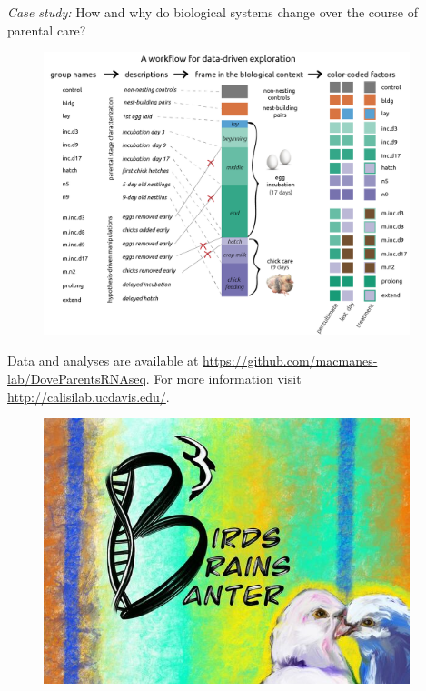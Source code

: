 \documentclass[final]{beamer}
\newlength{\sepwid}
\newlength{\onecolwid}
\begin{document}
\begin{frame}[t]
\begin{columns}[t]
\begin{column}{\onecolwid}
\begin{block}{\textit{Case study:} How and why do biological systems change over the course of parental care?}
\begin{figure}
\includegraphics[width=1\linewidth]{DoveParentsRNAseq_design.png}
\end{figure}

Data and analyses are available at \url{https://github.com/macmanes-lab/DoveParentsRNAseq}. For more information visit \url{http://calisilab.ucdavis.edu/}. 

\begin{figure}
\includegraphics[width=0.55\linewidth]{b3.jpg}
\end{figure}


\end{block}



\end{column} %

\begin{column}{\sepwid}\end{column} %


\end{columns}
\end{frame}
\end{document}
